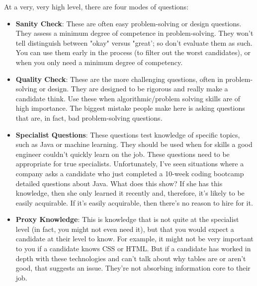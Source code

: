 \documentclass[14pt, noindent]{article}
\begin{document}
\vspace{20pt}
\large{At a very, very high level, there are four modes of questions:}
\begin{itemize}
\item \textbf{Sanity Check}: These are often easy problem-solving or design questions. They assess a
minimum degree of competence in problem-solving. They won't tell distinguish between "okay" versus
"great'; so don't evaluate them as such. You can use them early in the process (to filter out the
worst candidates), or when you only need a minimum degree of competency.

\item \textbf{Quality Check}: These are the more challenging questions, often in problem-solving or
design. They are designed to be rigorous and really make a candidate think. Use these when
algorithmic/problem solving skills are of high importance. The biggest mistake people make here
is asking questions that are, in fact, bad problem-solving questions.

\item \textbf{Specialist Questions}: These questions test knowledge of specific topics, such as Java
or machine learning. They should be used when for skills a good engineer couldn't quickly learn on the
job. These questions need to be appropriate for true specialists. Unfortunately, I've seen situations
where a company asks a candidate who just completed a 10-week coding bootcamp detailed questions about
Java. What does this show? If she has this knowledge, then she only learned it recently and, therefore,
it's likely to be easily acquirable. If it's easily acquirable, then there's no reason to hire for it.

\item \textbf{Proxy Knowledge}: This is knowledge that is not quite at the specialist level (in fact,
you might not even need it), but that you would expect a candidate at their level to know. For example,
it might not be very important to you if a candidate knows CSS or HTML. But if a candidate has worked
in depth with these technologies and can't talk about why tables are or aren't good, that suggests an
issue. They're not absorbing information core to their job.\\
\end{itemize}
\end{document}
